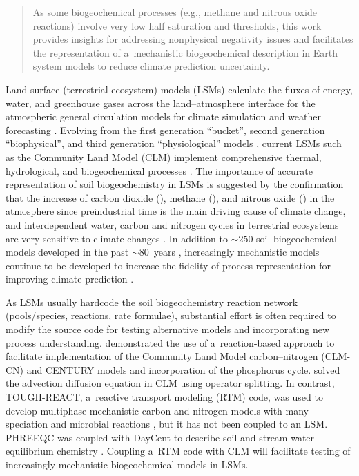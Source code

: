 \documentclass[gmd,noline]{copernicus}
\begin{document}
\begin{abstract}
      As some biogeochemical processes
      (e.g., methane and nitrous oxide reactions) involve
      very low half saturation and thresholds, this work
      provides insights for addressing nonphysical negativity issues and
      facilitates the representation of a~mechanistic biogeochemical
      description in Earth system models to reduce climate prediction
      uncertainty.
\end{abstract}


\introduction

      Land surface (terrestrial ecosystem) models (LSMs) calculate the
      fluxes of energy, water, and greenhouse gases across the
      land--atmosphere interface for the atmospheric general circulation
      models for climate simulation and weather forecasting
      \citep{Sellers1997}. Evolving from the first generation ``bucket'',
      second generation ``biophysical'', and third generation
      ``physiological'' models \citep{Seneviratne2010}, current LSMs such as
      the Community Land Model (CLM) implement comprehensive thermal,
      hydrological, and biogeochemical processes \citep{Oleson2013}. The
      importance of accurate representation of soil biogeochemistry in LSMs
      is suggested by the confirmation that the increase of carbon dioxide
      (), methane (), and nitrous oxide ()
      in the atmosphere since preindustrial time is the main driving cause
      of climate change, and interdependent water, carbon and nitrogen
      cycles in terrestrial ecosystems are very sensitive to climate changes
      \citep{IPCC2013}. In addition to $\sim 250$ soil biogeochemical models
      developed in the past $\sim 80$~years \citep{Manzoni2009},
      increasingly mechanistic models continue to be developed to increase
      the fidelity of process representation for improving climate
      prediction \citep[e.g.,][]{Riley2014}.

      As LSMs usually hardcode the soil biogeochemistry reaction network
      (pools/species, reactions, rate formulae), substantial effort is often
      required to modify the source code for testing alternative models and
      incorporating new process understanding. \citet{Fang2013} demonstrated
      the use of a~reaction-based approach to facilitate implementation of
      the Community Land Model carbon--nitrogen (CLM-CN) and CENTURY models and incorporation of the phosphorus
      cycle.  \citet{Tang2013b} solved the advection diffusion equation in
      CLM using operator splitting. In contrast, TOUGH-REACT, a~reactive
      transport modeling (RTM) code, was used to develop multiphase
      mechanistic carbon and nitrogen models with many speciation and
      microbial reactions \citep{Maggi2008,Gu2010,Riley2014}, but it has not
      been coupled to an LSM. PHREEQC was coupled with DayCent to describe
      soil and stream water equilibrium chemistry
      \citep{Hartman2007}. Coupling a~RTM code with CLM will facilitate
      testing of increasingly mechanistic biogeochemical models in LSMs.
\end{document}
